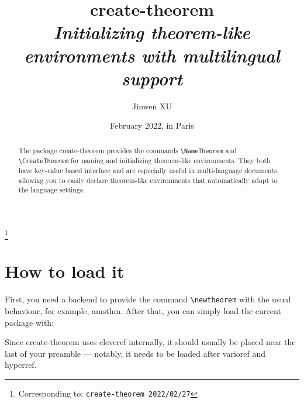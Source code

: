 \documentclass[classical]{einfart}
\newenvironment{tip}[1][Tip]{%
    \LocallyStopLineNumbers%
    \begin{tcolorbox}[breakable,
        enhanced,
        width = \textwidth,
        colback = paper, colbacktitle = paper,
        colframe = gray!50, boxrule=0.2mm,
        coltitle = black,
        fonttitle = \sffamily,
        attach boxed title to top left = {yshift=-\tcboxedtitleheight/2, xshift=.5cm},
        boxed title style = {boxrule=0pt, colframe=paper},
        before skip = 3mm,
        after skip = 3mm,
        top = 2.5mm,
        bottom = 1.5mm,
        title={\scshape\sffamily #1}]%
}{\end{tcolorbox}\ResumeLineNumbers}
\newcommand{\createtheorempackage}{\textsf{create-theorem}}
\begin{document}
\title{\createtheorempackage{}\\\smallskip\itshape Initializing theorem-like environments with multilingual support}
\author{Jinwen XU}
\thanks{Corresponding to: \texttt{\createtheorempackage{} 2022/02/27}}
\date{February 2022, in Paris}

\maketitle

\begin{abstract}
    \raggedleft
    The package \createtheorempackage{} provides the commands \lstinline|\NameTheorem| and \lstinline|\CreateTheorem| for naming and initializing theorem-like environments. They both have key-value based interface and are especially useful in multi-language documents, allowing you to easily declare theorem-like environments that automatically adapt to the language settings.
\end{abstract}

\vspace{-.5\baselineskip}



\section{How to load it}

First, you need a backend to provide the command \lstinline|\newtheorem| with the usual behaviour, for example, \textsf{amsthm}. After that, you can simply load the current package with:

\begin{code}
\usepackage{create-theorem}
\end{code}

\begin{tip}
    Since \createtheorempackage{} uses \textsf{cleveref} internally, it should usually be placed near the last of your preamble --- notably, it needs to be loaded after \textsf{varioref} and \textsf{hyperref}.
\end{tip}
\end{document}
